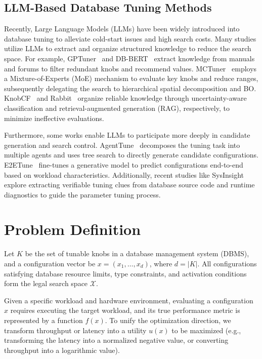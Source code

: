 \documentclass[runningheads]{llncs}
\begin{document}
\subsection{LLM-Based Database Tuning Methods}
Recently, Large Language Models (LLMs) have been widely introduced into
database tuning to alleviate cold-start issues and high search costs.
Many studies utilize LLMs to extract and organize structured knowledge to
reduce the search space. For example, GPTuner~\cite{gptuner} and
DB-BERT~\cite{dbbert} extract knowledge from manuals and forums to filter
redundant knobs and recommend values. MCTuner~\cite{mctuner} employs a
Mixture-of-Experts (MoE) mechanism to evaluate key knobs and reduce
ranges, subsequently delegating the search to hierarchical spatial
decomposition and BO. KnobCF~\cite{knobcf} and Rabbit~\cite{rabbit}
organize reliable knowledge through uncertainty-aware classification and
retrieval-augmented generation (RAG), respectively, to minimize
ineffective evaluations.

Furthermore, some works enable LLMs to participate more deeply in
candidate generation and search control. AgentTune~\cite{agenttune}
decomposes the tuning task into multiple agents and uses tree search to
directly generate candidate configurations. E2ETune~\cite{e2etune}
fine-tunes a generative model to predict configurations end-to-end based
on workload characteristics. Additionally, recent studies like
SysInsight~\cite{sysinsight} explore extracting verifiable tuning clues
from database source code and runtime diagnostics to guide the parameter
tuning process.
\section{Problem Definition}\label{sec:problem}

Let \(K\) be the set of tunable knobs in a database management system (DBMS), and a configuration vector be \(x = (x_1, \ldots, x_d)\), where \(d=|K|\). All configurations satisfying database resource limits, type constraints, and activation conditions form the legal search space \(\mathcal{X}\).

Given a specific workload and hardware environment, evaluating a configuration \(x\) requires executing the target workload, and its true performance metric is represented by a function \(f(x)\). To unify the optimization direction, we transform throughput or latency into a utility \(u(x)\) to be maximized (e.g., transforming the latency into a normalized negative value, or converting throughput into a logarithmic value).
\end{document}
